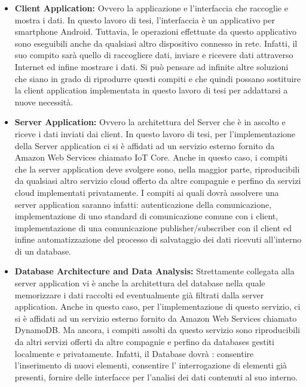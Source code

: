 \begin{itemize}
	\item \textbf{Client Application:} Ovvero la applicazione e l'interfaccia che raccoglie e mostra i dati. In questo lavoro di tesi, l'interfaccia è un applicativo per smartphone Android. Tuttavia, le operazioni effettuate da questo applicativo sono eseguibili anche da qualsiasi altro dispositivo connesso in rete. Infatti, il suo compito sarà quello di raccogliere dati, inviare e ricevere dati attraverso Internet ed infine mostrare i dati. Si può pensare ad infinite altre soluzioni che siano in grado di riprodurre questi compiti e che quindi possano sostituire la client application implementata in questo lavoro di tesi per addattarsi a nuove necessità.
	
	\item \textbf{Server Application:} Ovvero la architettura del Server che è in ascolto e riceve i dati inviati dai client. In questo lavoro di tesi, per l'implementazione della Server application ci si è affidati ad un servizio esterno fornito da Amazon Web Services chiamato IoT Core. Anche in questo caso, i compiti che la server application deve svolgere sono, nella maggior parte, riproducibili da qualsiasi altro servizio cloud offerto da altre compagnie e perfino da servizi cloud implementati privatamente. I compiti ai quali dovrà assolvere una server application saranno infatti: autenticazione della comunicazione, implementazione di uno standard di comunicazione comune con i client, implementazione di una comunicazione publisher/subscriber con il client ed infine automatizzazione del processo di salvataggio dei dati ricevuti all'interno di un database.
	
	\item \textbf{Database Architecture and Data Analysis:} Strettamente collegata alla server application vi è anche la architettura del database nella quale memorizzare i dati raccolti ed eventualmente già filtrati dalla server application. Anche in questo caso, per l'implementazione di questo servizio, ci si è affidati ad un servizio esterno fornito da Amazon Web Services chiamato DynamoDB. Ma ancora, i compiti assolti da questo servizio sono riproducibili da altri servizi offerti da altre compagnie e perfino da databases gestiti localmente e privatamente. Infatti, il Database dovrà : consentire l'inserimento di nuovi elementi, consentire l' interrogazione di elementi già presenti, fornire delle interfacce per l'analisi dei dati contenuti al suo interno. 
\end{itemize}

